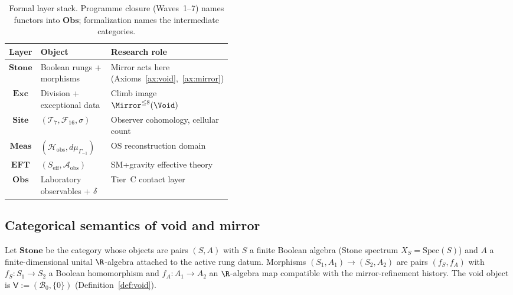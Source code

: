 \begin{table}[ht]
\centering
\small
\renewcommand{\arraystretch}{1.12}
\begin{tabular}{@{}clp{0.44\linewidth}@{}}
\toprule
\textbf{Layer} & \textbf{Object} & \textbf{Research role} \\
\midrule
$\mathbf{Stone}$ &
  Boolean rungs + morphisms &
  Mirror acts here (Axioms~\ref{ax:void},~\ref{ax:mirror}) \\
$\mathbf{Exc}$ &
  Division + exceptional data &
  Climb image $\Mirror^{\leq 8}(\Void)$ \\
$\mathbf{Site}$ &
  $(\mathcal{T}_7,\mathcal{F}_{16},\sigma)$ &
  Observer cohomology, cellular count \\
$\mathbf{Meas}$ &
  $(\mathcal{H}_{\mathrm{obs}},d\mu_{\Gamma_{-1}})$ &
  OS reconstruction domain \\
$\mathbf{EFT}$ &
  $(S_{\mathrm{eff}},\mathcal{A}_{\mathrm{obs}})$ &
  SM+gravity effective theory \\
$\mathbf{Obs}$ &
  Laboratory observables + $\delta$ &
  Tier~C contact layer \\
\bottomrule
\end{tabular}
\caption{Formal layer stack. Programme closure (Waves~1--7) names functors into
$\mathbf{Obs}$; formalization names the intermediate categories.}
\label{tab:formal-layers}
\end{table}

\subsection{Categorical semantics of void and mirror}
\label{sec:formal-foundations:category}

\begin{definition}\label{def:stone-category}
Let $\mathbf{Stone}$ be the category whose objects are pairs
$(S,A)$ with $S$ a finite Boolean algebra (Stone spectrum
$X_S=\mathrm{Spec}(S)$) and $A$ a finite-dimensional unital $\R$-algebra
attached to the active rung datum. Morphisms $(S_1,A_1)\to(S_2,A_2)$ are pairs
$(f_S,f_A)$ with $f_S:S_1\to S_2$ a Boolean homomorphism and $f_A:A_1\to A_2$
an $\R$-algebra map compatible with the mirror-refinement history. The void
object is $\mathsf{V}:=(\mathcal{B}_0,\{0\})$ (Definition~\ref{def:void}).
\end{definition}

